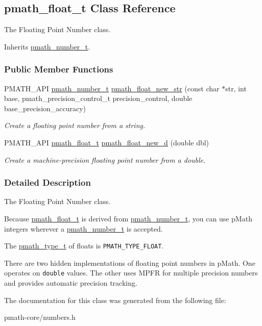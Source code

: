 \hypertarget{classpmath__float__t}{
\subsection{pmath\_\-float\_\-t Class Reference}
\label{classpmath__float__t}
}
The Floating Point Number class.  


Inherits \hyperlink{classpmath__number__t}{pmath\_\-number\_\-t}.

\subsubsection*{Public Member Functions}
\begin{CompactItemize}
\item 
PMATH\_\-API \hyperlink{classpmath__number__t}{pmath\_\-number\_\-t} \hyperlink{group__numbers_g6c67d61f1a57084cc46e858a307ec461}{pmath\_\-float\_\-new\_\-str} (const char $\ast$str, int base, pmath\_\-precision\_\-control\_\-t precision\_\-control, double base\_\-precision\_\-accuracy)
\begin{CompactList}\small\item\em Create a floating point number from a string. \item\end{CompactList}\item 
PMATH\_\-API \hyperlink{classpmath__float__t}{pmath\_\-float\_\-t} \hyperlink{group__numbers_g5c3beb5316feb510ee46f72f11b49117}{pmath\_\-float\_\-new\_\-d} (double dbl)
\begin{CompactList}\small\item\em Create a machine-precision floating point number from a double. \item\end{CompactList}\end{CompactItemize}


\subsubsection{Detailed Description}
The Floating Point Number class. 

Because \hyperlink{classpmath__float__t}{pmath\_\-float\_\-t} is derived from \hyperlink{classpmath__number__t}{pmath\_\-number\_\-t}, you can use pMath integers wherever a \hyperlink{classpmath__number__t}{pmath\_\-number\_\-t} is accepted.

The \hyperlink{group__objects_ge2646df76dcb0113715322b13a1f36f0}{pmath\_\-type\_\-t} of floats is {\tt PMATH\_\-TYPE\_\-FLOAT}.

There are two hidden implementations of floating point numbers in pMath. One operates on {\tt double} values. The other uses MPFR for multiple precision numbers and provides automatic precision tracking. 

The documentation for this class was generated from the following file:\begin{CompactItemize}
\item 
pmath-core/numbers.h\end{CompactItemize}
